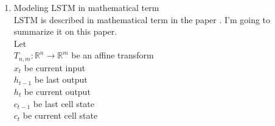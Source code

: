 \documentclass[12pt]{article}
\begin{document}
\begin{enumerate}
\begin{enumerate}
\begin{enumerate}
\begin{enumerate}
			\item Modeling LSTM in mathematical term\\
				LSTM is described in mathematical term in the paper \cite{zaremba2014recurrent}. I'm going to summarize it on this paper.\\
				Let\\
				$T_{n,m}: \mathbb{R}^n \rightarrow \mathbb{R}^m$ be an affine transform\\
				$x_t$ be current input \\
				$h_{t-1}$ be last output \\
				$h_{t}$ be current output \\
				$c_{t-1}$ be last cell state \\
				$c_{t}$ be current cell state \\


\end{enumerate}
\end{enumerate}
\end{enumerate}
\end{enumerate}
\end{document}
